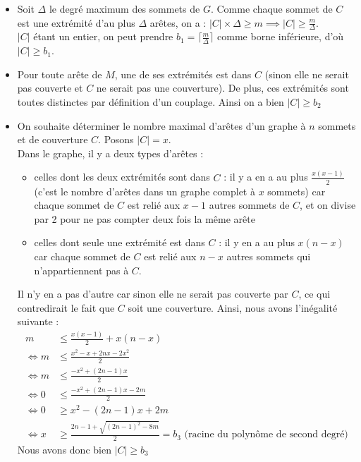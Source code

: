 \documentclass[12pt]{article}
\begin{document}
        \begin{itemize}
            \item Soit $\Delta$ le degré maximum des sommets de $G$. Comme chaque sommet de $C$ est une extrémité d'au plus $\Delta$ arêtes, on a : $|C| \times \Delta \geq m \implies |C| \geq \frac{m}{\Delta}$. \\
            $|C|$ étant un entier, on peut prendre $b_1 = \lceil \frac{m}{\Delta} \rceil$ comme borne inférieure, d'où $\boxed{|C| \geq b_1}$. 
            
            \item Pour toute arête de $M$, une de ses extrémités est dans $C$ (sinon elle ne serait pas couverte et $C$ ne serait pas une couverture). De plus, ces extrémités sont toutes distinctes par définition d'un couplage. Ainsi on a bien $\boxed{|C| \geq b_2}$
            
            \item On souhaite déterminer le nombre maximal d'arêtes d'un graphe à $n$ sommets et de couverture $C$. Posons $|C| = x$. \\
            Dans le graphe, il y a deux types d'arêtes :
            \begin{itemize}
                \item celles dont les deux extrémités sont dans $C$ : il y a en a au plus $\frac{x(x-1)}{2}$ (c'est le nombre d'arêtes dans un graphe complet à $x$ sommets) car chaque sommet de $C$ est relié aux $x-1$ autres sommets de $C$, et on divise par 2 pour ne pas compter deux fois la même arête
                \item celles dont seule une extrémité est dans $C$ : il y en a au plus $x(n-x)$ car chaque sommet de $C$ est relié aux $n-x$ autres sommets qui n'appartiennent pas à $C$.
            \end{itemize}
            Il n'y en a pas d'autre car sinon elle ne serait pas couverte par $C$, ce qui contredirait le fait que $C$ soit une couverture.
            Ainsi, nous avons l'inégalité suivante :
            \begin{align*}
                m &\leq \frac{x(x-1)}{2} + x(n-x) \\
                \iff m &\leq \frac{x^2 - x + 2nx - 2x^2}{2} \\
                \iff m &\leq \frac{-x^2 + (2n-1)x}{2} \\
                \iff 0 &\leq \frac{-x^2 +(2n-1)x - 2m}{2} \\
                \iff 0 &\geq x^2 -(2n-1)x + 2m \\
                \iff x &\geq \frac{2n-1 + \sqrt{(2n-1)^2 - 8m}}{2} = b_3 \text{ (racine du polynôme de second degré)}
            \end{align*}
            Nous avons donc bien $\boxed{|C| \geq b_3}$
        \end{itemize}
\end{document}
